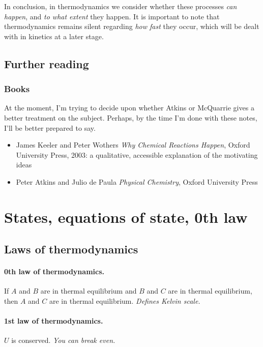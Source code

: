 \documentclass{article}
\numberwithin{theorem}{section}
\numberwithin{corollary}{section}
\numberwithin{postulate}{section}
\numberwithin{lemma}{section}
\numberwithin{definition}{section}
\begin{document}
In conclusion, in thermodynamics we consider whether these processes \textit{can
happen}, and \textit{to what extent} they happen. It is important to note that
thermodynamics remains silent regarding \textit{how fast} they occur, which will
be dealt with in kinetics at a later stage.

\subsection{Further reading}

\subsubsection{Books}
At the moment, I'm trying to decide upon whether Atkins or McQuarrie gives a
better treatment on the subject. Perhaps, by the time I'm done with these notes,
I'll be better prepared to say.

\begin{itemize}

  \item James Keeler and Peter Wothers \textit{Why Chemical Reactions Happen},
    Oxford University Press, 2003: a qualitative, accessible explanation of the
    motivating ideas

  \item Peter Atkins and Julio de Paula \textit{Physical Chemistry}, Oxford
    University Press
\end{itemize}

\setcounter{section}{0}
\section{States, equations of state, 0th law}

\subsection{Laws of thermodynamics}

\paragraph{0th law of thermodynamics.} If $A$ and $B$ are in thermal equilibrium
and $B$ and $C$ are in thermal equilibrium, then $A$ and $C$ are in thermal 
equilibrium. \textit{Defines Kelvin scale.}

\paragraph{1st law of thermodynamics.} $U$ is conserved. \textit{You can break
even.}
\end{document}
